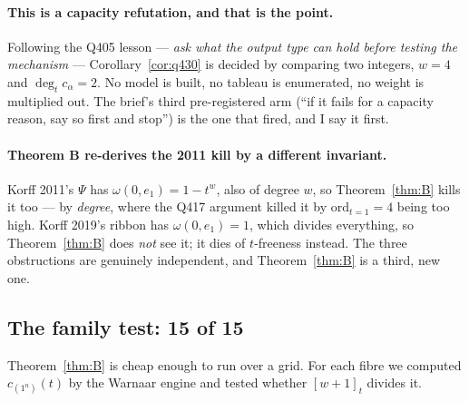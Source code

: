 \documentclass[11pt]{article}
\theoremstyle{plain}
\theoremstyle{definition}
\theoremstyle{remark}
\newcommand{\qbin}[1]{[#1]_t}
\begin{document}
\paragraph{This is a capacity refutation, and that is the point.}
Following the Q405 lesson --- \emph{ask what the output type can hold before testing the
mechanism} --- Corollary~\ref{cor:q430} is decided by comparing two integers, $w=4$ and
$\deg_t c_\alpha=2$. No model is built, no tableau is enumerated, no weight is
multiplied out. The brief's third pre-registered arm (``if it fails for a capacity reason,
say so first and stop'') is the one that fired, and I say it first.

\paragraph{Theorem B re-derives the 2011 kill by a different invariant.}
Korff 2011's $\Psi$ has $\omega(0,e_1)=1-t^{w}$, also of degree $w$, so
Theorem~\ref{thm:B} kills it too --- by \emph{degree}, where the Q417 argument killed it by
$\mathrm{ord}_{t=1}=4$ being too high. Korff 2019's ribbon has $\omega(0,e_1)=1$, which
divides everything, so Theorem~\ref{thm:B} does \emph{not} see it; it dies of
$t$-freeness instead. The three obstructions are genuinely independent, and
Theorem~\ref{thm:B} is a third, new one.

\subsection{The family test: 15 of 15}

Theorem~\ref{thm:B} is cheap enough to run over a grid. For each fibre we computed
$c_{(1^n)}(t)$ by the Warnaar engine and tested whether $\qbin{w+1}$ divides it.
\end{document}
